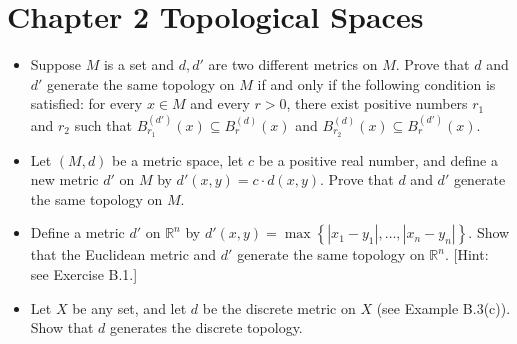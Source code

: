 \documentclass[12pt]{article}
\newenvironment{exercise}[2][Exercise]{\begin{trivlist}
\item[\hskip \labelsep {\bfseries #1}\hskip \labelsep {\bfseries #2.}]}{\end{trivlist}}
\begin{document}

\rhead{\today}



\section*{Chapter 2 Topological Spaces}

\begin{exercise}{2.4}
\begin{itemize}
\item Suppose $M$ is a set and $d,d'$ are two different metrics on $M$. Prove that $d$ and $d'$ generate the same topology on $M$ if and only if the following condition is satisfied: for every $x\in M$ and every $r>0$, there exist positive numbers $r_1$ and $r_2$ such that $B_{r_1}^{\left(d'\right)}\left(x\right) \subseteq B_r^{\left(d\right)}\left(x\right)$ and $B_{r_2}^{\left(d\right)}\left(x\right) \subseteq B_r^{\left(d'\right)}\left(x\right)$.
\item Let $\left(M,d\right)$ be a metric space, let $c$ be a positive real number, and define a new metric $d'$ on $M$ by $d'\left(x,y\right)=c\cdot d\left(x,y\right)$. Prove that $d$ and $d'$ generate the same topology on $M$.
\item Define a metric $d'$ on $\mathbb{R}^n$ by $d'\left(x,y\right)= \max \left\{\left|x_1-y_1\right|,\ldots,\left|x_n-y_n\right|\right\}$. Show that the Euclidean metric and $d'$ generate the same topology on $\mathbb{R}^n$. [Hint: see Exercise B.1.]
\item Let $X$ be any set, and let $d$ be the discrete metric on $X$ (see Example B.3(c)). Show that $d$ generates the discrete topology.
\end{itemize}
\end{exercise}
\end{document}
